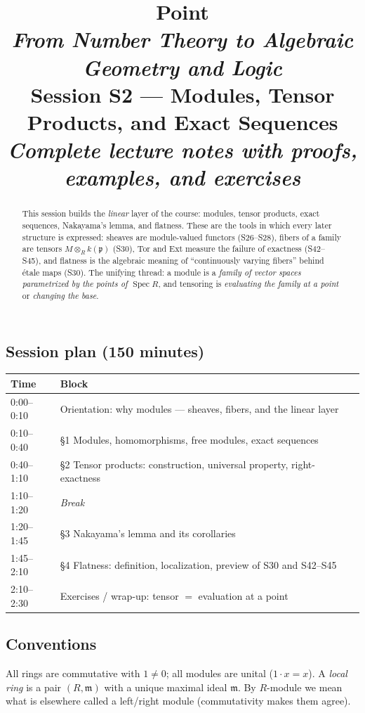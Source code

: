 \documentclass[11pt,a4paper]{article}
\title{
  {\color{blue!40!black}\textbf{\Huge Point}}\\[0.3em]
  \Large \textit{From Number Theory to Algebraic Geometry and Logic}\\[0.7em]
  \large \textbf{Session S2 --- Modules, Tensor Products, and Exact Sequences}\\[0.3em]
  \normalsize \emph{Complete lecture notes with proofs, examples, and exercises}
}
\author{}
\date{}
\theoremstyle{definition}
\newcommand{\m}{\mathfrak{m}}
\newcommand{\Spec}{\operatorname{Spec}}
\newcommand{\p}{\mathfrak{p}}
\begin{document}
\maketitle
\thispagestyle{empty}

\begin{abstract}
\noindent
This session builds the \emph{linear} layer of the course: modules, tensor products, exact
sequences, Nakayama's lemma, and flatness. These are the tools in which every later structure is
expressed: sheaves are module-valued functors (S26--S28), fibers of a family are tensors
$M\otimes_R k(\p)$ (S30), Tor and Ext measure the failure of exactness (S42--S45), and flatness is
the algebraic meaning of ``continuously varying fibers'' behind \'etale maps (S30). The unifying
thread: a module is a \emph{family of vector spaces parametrized by the points of $\Spec R$}, and
tensoring is \emph{evaluating the family at a point} or \emph{changing the base}.
\end{abstract}

\subsection*{Session plan (150 minutes)}
\begin{center}\small
\begin{tabular}{|l|l|}
\hline
\textbf{Time} & \textbf{Block} \\
\hline
0:00--0:10 & Orientation: why modules --- sheaves, fibers, and the linear layer \\
0:10--0:40 & \S1 Modules, homomorphisms, free modules, exact sequences \\
0:40--1:10 & \S2 Tensor products: construction, universal property, right-exactness \\
1:10--1:20 & \emph{Break} \\
1:20--1:45 & \S3 Nakayama's lemma and its corollaries \\
1:45--2:10 & \S4 Flatness: definition, localization, preview of S30 and S42--S45 \\
2:10--2:30 & Exercises / wrap-up: tensor $=$ evaluation at a point \\
\hline
\end{tabular}
\end{center}

\subsection*{Conventions}
All rings are commutative with $1\neq0$; all modules are unital ($1\cdot x=x$).
A \emph{local ring} is a pair $(R,\m)$ with a unique maximal ideal $\m$.
By $R$-module we mean what is elsewhere called a left/right module (commutativity makes them agree).
\end{document}
